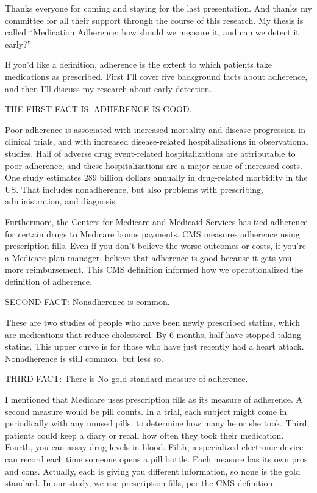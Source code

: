 \documentclass[12pt]{report}
\begin{document}
\begin{large}

Thanks everyone for coming and staying for the last presentation. And
thanks my committee for all their support through the course of this
research. My thesis is called ``Medication Adherence: how should we
measure it, and can we detect it early?''

If you'd like a definition, adherence is the extent to which patients
take medications as prescribed. First I'll cover five background facts
about adherence, and then I'll discuss my research about early
detection.

THE FIRST FACT IS: ADHERENCE IS GOOD.

Poor adherence is associated with increased mortality and disease
progression in clinical trials, and with increased disease-related
hospitalizations in observational studies. Half of adverse drug
event-related hospitalizations are attributable to poor adherence, and
these hospitalizations are a major cause of increased costs. One study
estimates 289 billion dollars annually in drug-related morbidity in
the US. That includes nonadherence, but also problems with
prescribing, administration, and diagnosis.

Furthermore, the Centers for Medicare and Medicaid Services has tied
adherence for certain drugs to Medicare bonus payments. CMS measures
adherence using prescription fills. Even if you don't believe the
worse outcomes or costs, if you're a Medicare plan manager, believe
that adherence is good because it gets you more reimbursement. This
CMS definition informed how we operationalized the definition of
adherence.

SECOND FACT: Nonadherence is common.

These are two studies of people who have been newly prescribed
statins, which are medications that reduce cholesterol. By 6 months,
half have stopped taking statins. This upper curve is for those who
have just recently had a heart attack. Nonadherence is still common,
but less so.

THIRD FACT: There is No gold standard measure of adherence.

I mentioned that Medicare uses prescription fills as its measure of
adherence. A second measure would be pill counts. In a trial, each
subject might come in periodically with any unused pills, to determine
how many he or she took. Third, patients could keep a diary or recall
how often they took their medication. Fourth, you can assay drug
levels in blood. Fifth, a specialized electronic device can record
each time someone opens a pill bottle. Each measure has its own pros
and cons. Actually, each is giving you different information, so none
is the gold standard. In our study, we use prescription fills, per the
CMS definition.


\end{large}
\end{document}
